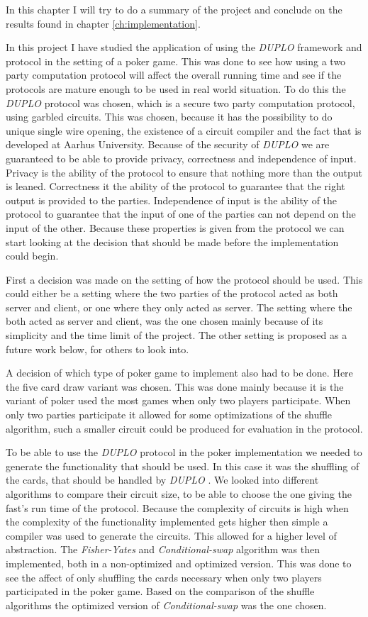 \documentclass[twoside,11pt,openright]{report}
\newcommand{\FY}{\textit{Fisher-Yates} }
\newcommand{\CS}{\textit{Conditional-swap} }
\newcommand{\DUPLO}{\textit{DUPLO} }
\begin{document}
In this chapter I will try to do a summary of the project and conclude on the results found in chapter \ref{ch:implementation}.

In this project I have studied the application of using the \DUPLO framework and protocol in the setting of a poker game. This was done to see how using a two party computation protocol will affect the overall running time and see if the protocols are mature enough to be used in real world situation. To do this the \DUPLO protocol was chosen, which is a secure two party computation protocol, using garbled circuits. This was chosen, because it has the possibility to do unique single wire opening, the existence of a circuit compiler and the fact that is developed at Aarhus University. Because of the security of \DUPLO we are guaranteed to be able to provide privacy, correctness and independence of input. Privacy is the ability of the protocol to ensure that nothing more than the output is leaned. Correctness it the ability of the protocol to guarantee that the right output is provided to the parties. Independence of input is the ability of the protocol to guarantee that the input of one of the parties can not depend on the input of the other. Because these properties is given from the protocol we can start looking at the decision that should be made before the implementation could begin.

First a decision was made on the setting of how the protocol should be used. This could either be a setting where the two parties of the protocol acted as both server and client, or one where they only acted as server. The setting where the both acted as server and client, was the one chosen mainly because of its simplicity and the time limit of the project. The other setting is proposed as a future work below, for others to look into.

A decision of which type of poker game to implement also had to be done. Here the five card draw variant was chosen. This was done mainly because it is the variant of poker used the most games when only two players participate. When only two parties participate it allowed for some optimizations of the shuffle algorithm, such a smaller circuit could be produced for evaluation in the protocol.

To be able to use the \DUPLO protocol in the poker implementation we needed to generate the functionality that should be used. In this case it was the shuffling of the cards, that should be handled by \DUPLO. We looked into different algorithms to compare their circuit size, to be able to choose the one giving the fast's run time of the protocol. Because the complexity of circuits is high when the complexity of the functionality implemented gets higher then simple a compiler was used to generate the circuits. This allowed for a higher level of abstraction. The \FY and \CS algorithm was then implemented, both in a non-optimized and optimized version. This was done to see the affect of only shuffling the cards necessary when only two players participated in the poker game. Based on the comparison of the shuffle algorithms the optimized version of \CS was the one chosen.
\end{document}

